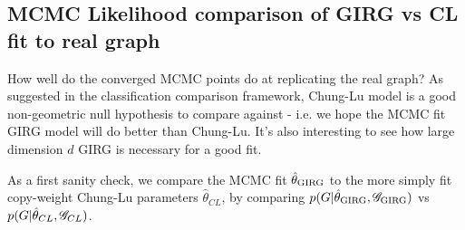 \subsection{MCMC Likelihood comparison of GIRG vs CL fit to real graph}
How well do the converged MCMC points do at replicating the real graph? As suggested in the classification comparison framework, Chung-Lu model is a good non-geometric null hypothesis to compare against - i.e. we hope the MCMC fit GIRG model will do better than Chung-Lu. It's also interesting to see how large dimension $d$ GIRG is necessary for a good fit.

As a first sanity check, we compare the MCMC fit $\hat{\theta}_{\mathrm{GIRG}}$ to the more simply fit copy-weight Chung-Lu parameters $\hat{\theta}_{CL}$, by comparing $p(G | \hat{\theta}_{\mathrm{GIRG}}, \mathscr{G}_{\mathrm{GIRG}})$ vs $p(G | \hat{\theta}_{CL}, \mathscr{G}_{CL})$. 

